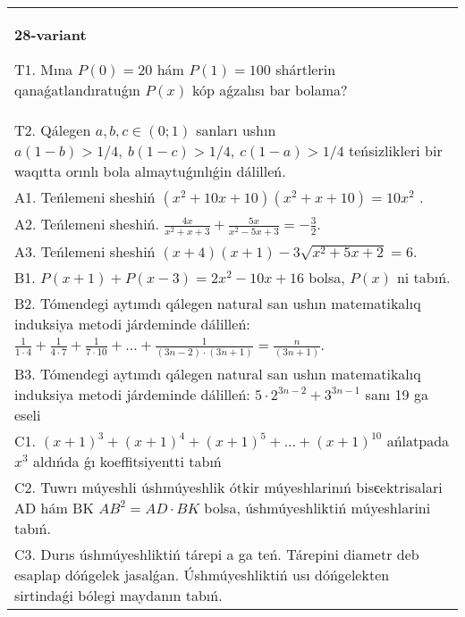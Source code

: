 \documentclass{article}
\begin{document}
\begin{tabular}{m{17cm}}
\textbf{28-variant}
\newline

T1. Mına \(P(0) = 20\) hám \(P(1) = 100\) shártlerin qanaǵatlandıratuǵın \(P(x)\) kóp aǵzalısı bar bolama? \\
T2. Qálegen \(a,b,c \in (0;1)\) sanları ushın \(a(1 - b) > 1/4,\ b(1 - c) > 1/4,\ c(1 - a) > 1/4\) teńsizlikleri bir waqıtta orınlı bola almaytuǵınlıǵin dálilleń. \\
A1. Teńlemeni sheshiń \(\left( x^{2} + 10x + 10 \right)\left( x^{2} + x + 10 \right) = 10x^{2}\) . \\
A2. Teńlemeni sheshiń. \(\frac{4x}{x^{2} + x + 3} + \frac{5x}{x^{2} - 5x + 3} = - \frac{3}{2}\). \\
A3. Teńlemeni sheshiń \((x + 4)(x + 1) - 3\sqrt{x^{2} + 5x + 2} = 6\). \\
B1. \(P(x + 1) + P(x - 3) = 2x^{2} - 10x + 16\) bolsa, \(P(x)\) ni tabıń. \\
B2. Tómendegi aytımdı qálegen natural san ushın matematikalıq induksiya metodi járdeminde dálilleń: \(\frac{1}{1 \cdot 4} + \frac{1}{4 \cdot 7} + \frac{1}{7 \cdot 10} + \ldots + \frac{1}{(3n - 2) \cdot (3n + 1)} = \frac{n}{(3n + 1)}\). \\
B3. Tómendegi aytımdı qálegen natural san ushın matematikalıq induksiya metodi járdeminde dálilleń: \(5 \cdot 2^{3n - 2} + 3^{3n - 1}\) sanı 19 ga eseli \\
C1. \((x + 1)^{3} + (x + 1)^{4} + (x + 1)^{5} + ... + (x + 1)^{10}\) ańlatpada \(x^{3}\) aldıńda ǵı koeffitsiyentti tabıń \\
C2. Tuwrı múyeshli úshmúyeshlik ótkir múyeshlarinıń bisєektrisalari AD hám BK \(AB^{2} = AD \cdot BK\) bolsa, úshmúyeshliktiń múyeshlarini tabıń. \\
C3. Durıs úshmúyeshliktiń tárepi a ga teń. Tárepini diametr deb esaplap dóńgelek jasalǵan. Úshmúyeshliktiń usı dóńgelekten sirtindaǵi bólegi maydanın tabıń. \\

\end{tabular}
\vspace{1cm}
\end{document}
